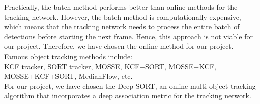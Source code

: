 \documentclass[conference]{IEEEtran}
\begin{document}
Practically, the batch method performs better than online methods for the tracking network. However, the batch method is computationally expensive, which means that the tracking network needs to process the entire batch of detections before starting the next frame. Hence, this approach is not viable for our project. Therefore, we have chosen the online method for our project. \\
Famous object tracking methods include:\\
KCF tracker, SORT tracker, MOSSE, KCF+SORT, MOSSE+KCF, MOSSE+KCF+SORT, MedianFlow, etc. \\

For our project, we have chosen the Deep SORT, an online multi-object tracking algorithm that incorporates a deep association metric for the tracking network.
\end{document}
